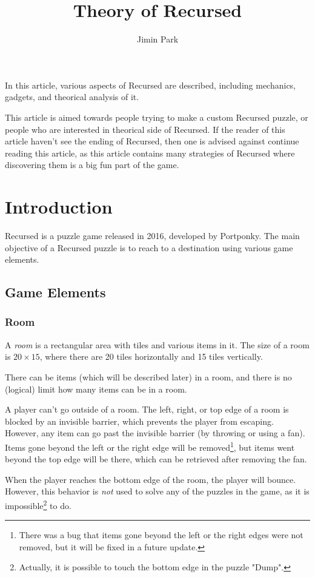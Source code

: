 \documentclass[a4paper]{article}
\theoremstyle{definition}
\begin{document}
\title{Theory of Recursed}
\author{Jimin Park}
\maketitle

In this article, various aspects of Recursed are described, including mechanics, gadgets, and theorical analysis of it.

This article is aimed towards people trying to make a custom Recursed puzzle, or people who are interested in theorical side of Recursed.
If the reader of this article haven't see the ending of Recursed, then one is advised against continue reading this article,
as this article contains many strategies of Recursed where discovering them is a big fun part of the game.

\tableofcontents

\section{Introduction}
Recursed is a puzzle game released in 2016, developed by Portponky.
The main objective of a Recursed puzzle is to reach to a destination using various game elements.

\subsection{Game Elements}
\subsubsection{Room}
A \emph{room} is a rectangular area with tiles and various items in it.
The size of a room is $20\times15$, where there are 20 tiles horizontally and 15 tiles vertically.

There can be items (which will be described later) in a room, and there is no (logical) limit how many items can be in a room.

A player can't go outside of a room. The left, right, or top edge of a room is blocked by an invisible barrier,
which prevents the player from escaping. However, any item can go past the invisible barrier (by throwing or using a fan).
Items gone beyond the left or the right edge will be removed\footnote{There was a bug that items gone beyond the left or the right
edges were not removed, but it will be fixed in a future update.},
but items went beyond the top edge will be there, which can be retrieved after removing the fan.

When the player reaches the bottom edge of the room, the player will bounce.
However, this behavior is \emph{not} used to solve any of the puzzles in the game,
as it is impossible\footnote{Actually, it is possible to touch the bottom edge in the puzzle "Dump".} to do.
\end{document}
